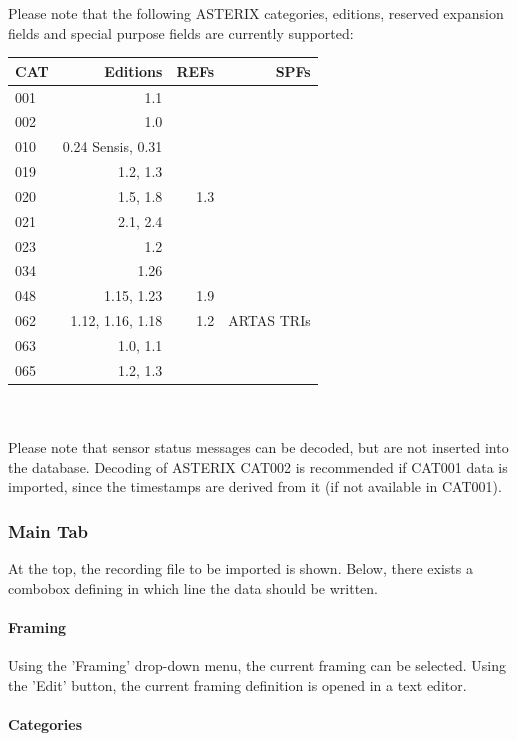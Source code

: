 Please note that the following ASTERIX categories, editions, reserved expansion fields and special purpose fields are currently supported: \\

\begin{tabular}{ | l | r | r | r |}
\hline
  CAT & Editions & REFs & SPFs  \\ \hline
  001 & 1.1 &  &  \\ \hline
  002 & 1.0 &  &  \\ \hline
  010 & 0.24 Sensis, 0.31  &  &  \\ \hline
  019 & 1.2, 1.3 & & \\ \hline
  020 & 1.5, 1.8 & 1.3 & \\ \hline
  021 & 2.1, 2.4 & & \\ \hline
  023 & 1.2 & & \\ \hline
  034 & 1.26 & & \\ \hline
  048 & 1.15, 1.23 & 1.9 & \\ \hline
  062 & 1.12, 1.16, 1.18 & 1.2 & ARTAS TRIs \\ \hline
  063 & 1.0, 1.1 & & \\ \hline
  065 & 1.2, 1.3 & & \\ \hline
\end{tabular} \\
\  \\

Please note that sensor status messages can be decoded, but are not inserted into the database. 
Decoding of ASTERIX CAT002 is recommended if CAT001 data is imported, since the timestamps are derived from it (if not available in CAT001).

\subsubsection{Main Tab}

At the top, the recording file to be imported is shown. Below, there exists a combobox defining in which line the data should be written. \\

\paragraph{Framing}
Using the 'Framing' drop-down menu, the current framing can be selected. Using the 'Edit' button, the current framing definition is opened in a text editor.

\paragraph{Categories}


